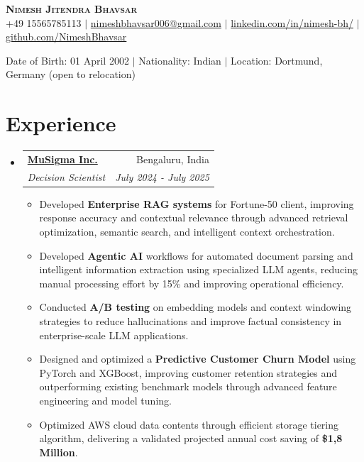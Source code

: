 \documentclass[letterpaper,11pt]{article}
\makeatletter
\newcommand{\resumeItem}[1]{
  \item\small{
    {#1 \vspace{-2pt}}
  }
}
\newcommand{\resumeSubheading}[4]{
  \vspace{-2pt}\item
    \begin{tabular*}{0.97\textwidth}[t]{p{0.75\textwidth}@{\extracolsep{\fill}}r}
      \textbf{#1} & #2 \\
      \textit{\small#3} & \textit{\small #4} \\
    \end{tabular*}\vspace{-7pt}
}
\newcommand{\resumeSubHeadingListStart}{\begin{itemize}[leftmargin=0.15in, label={}]}
\newcommand{\resumeSubHeadingListEnd}{\end{itemize}}
\newcommand{\resumeItemListStart}{\begin{itemize}}
\newcommand{\resumeItemListEnd}{\end{itemize}\vspace{-5pt}}
\makeatother
\begin{document}
\begin{center}
    \textbf{\Huge \scshape Nimesh Jitendra Bhavsar}\\ \vspace{5pt}
     +49 15565785113 $|$
    \href{mailto:nimeshbhavsar006@gmail.com}{nimeshbhavsar006@gmail.com} $|$
    \href{https://www.linkedin.com/in/nimesh-bh/}{linkedin.com/in/nimesh-bh/} $|$
    \href{https://github.com/NimeshBhavsar}{github.com/NimeshBhavsar}
    
    Date of Birth: 01 April 2002 $|$ Nationality: Indian $|$ Location: Dortmund, Germany (open to relocation)
\end{center}



\section{\textbf{Experience}}
  \resumeSubHeadingListStart
\vspace{6pt}
  \resumeSubheading
  {\href{https://drive.google.com/file/d/13RMTlsidTEFLCmQP5hAM6XNFgOWlJQT5}{\textbf{MuSigma Inc.}} }{Bengaluru, India}
{Decision Scientist}{July 2024 - July 2025}
  \vspace{2pt}
  \resumeItemListStart
    \resumeItem{
    Developed \textbf{Enterprise RAG systems} for Fortune-50 client, improving response accuracy and contextual relevance through advanced retrieval optimization, semantic search, and intelligent context orchestration.}
    \resumeItem{Developed \textbf{Agentic AI} workflows for automated document parsing and intelligent information extraction using specialized LLM agents, reducing manual processing effort by 15\% and improving operational efficiency.}
    \resumeItem{Conducted \textbf{A/B testing} on embedding models and context windowing strategies to reduce hallucinations and improve factual consistency in enterprise-scale LLM applications.}
    \resumeItem{Designed and optimized a \textbf{Predictive Customer Churn Model} using PyTorch and XGBoost, improving customer retention strategies and outperforming existing benchmark models through advanced feature engineering and model tuning.}
    \resumeItem{Optimized AWS cloud data contents through efficient storage tiering algorithm, delivering a validated projected annual cost saving of \textbf{\$1,8 Million}.}
  \resumeItemListEnd
\resumeSubHeadingListEnd
\end{document}
